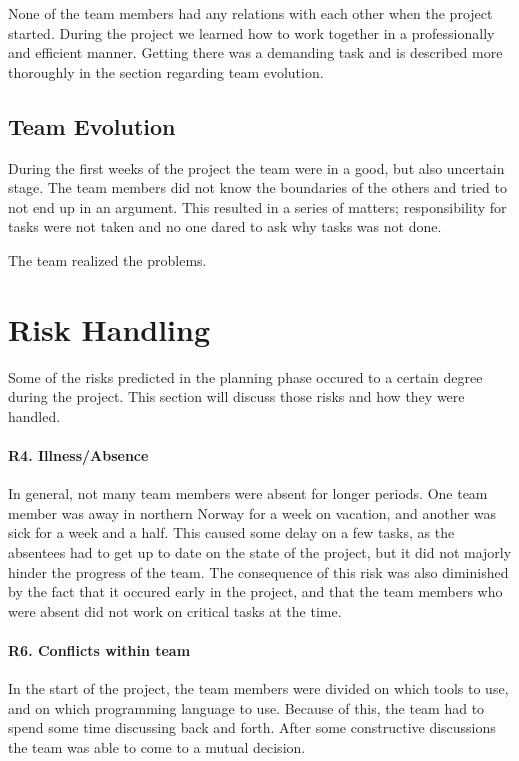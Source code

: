 None of the team members had any relations with each other when the project started. During the project we learned how to work together in a professionally and efficient manner. Getting there was a demanding task and is described more thoroughly in the section regarding team evolution.

\subsection{Team Evolution}
During the first weeks of the project the team were in a good, but also uncertain stage. The team members did not know the boundaries of the others and tried to not end up in an argument. This resulted in a series of matters; responsibility for tasks were not taken and no one dared to ask why tasks was not done.

The team realized the problems.

\section{Risk Handling}
Some of the risks predicted in the planning phase occured to a certain degree during the project.
This section will discuss those risks and how they were handled.

\paragraph{R4. Illness/Absence}
In general, not many team members were absent for longer periods.
One team member was away in northern Norway for a week on vacation, and another was sick for a week and a half. This caused some delay on a few tasks, as the absentees had to get up to date on the state of the project, but it did not majorly hinder the progress of the team. The consequence of this risk was also diminished by the fact that it occured early in the project, and that the team members who were absent did not work on critical tasks at the time.

\paragraph{R6. Conflicts within team}
In the start of the project, the team members were divided on which tools to use, and on which programming language to use. Because of this, the team had to spend some time discussing back and forth. After some constructive discussions the team was able to come to a mutual decision.

